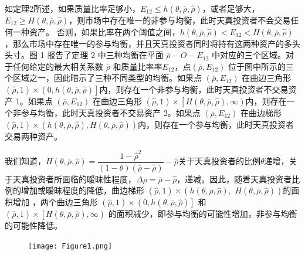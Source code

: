 \documentclass[10.0pt]{article}
\begin{document}
\quad \ 


如定理2所述，如果质量比率足够小，$ E_{1 2} \leqslant h (\theta, \overline{\rho}, {\hat \rho}) $，或者足够大，$ E_{ 1 2} \geqslant H (\theta, \overline{\rho}, {\hat \rho}) $，则市场中存在唯一的非参与均衡，此时天真投资者不会交易任何一种资产。 否则，如果比率在两个阈值之间，$ h (\theta, \overline{\rho}, {\hat \rho}) < E_{1 2} < H (\theta, \overline{\rho} , {\hat \rho}) $，那么市场中存在唯一的参与均衡，并且天真投资者同时将持有这两种资产的多头头寸。图 1 报告了定理 2 中三种均衡在平面 $ \overline{\rho} - O - E_{1 2} $ 中对应的三个区域。对于任何给定的最大相关系数 $ \overline{\rho} $ 和质量比率率$ E_{1 2} $，点$ \left( \overline{\rho}, E_{1 2} \right) $ 位于图中所示的三个区域之一，因此暗示了三种不同类型的均衡。如果点 $ \left( \overline{\rho}, E_{1 2} \right) $ 在曲边三角形 $ (\hat{\rho}, 1) \times \left( 0, h (\theta , \overline{\rho}, {\hat \rho}) \right] $内，则存在一个非参与均衡，此时天真投资者不交易资产 1。如果点 $ \left( \overline {\rho}, E_{1 2} \right) $ 在曲边三角形 $ (\hat{\rho}, 1) \times \left[ H (\theta, \overline{\rho}, {\hat \rho}), \infty \right) $内，则存在一个非参与均衡，此时天真投资者不交易资产 2。如果点 $ \left( \overline{\rho}, E_{1 2} \right) $ 在曲边梯形 $ (\hat{\rho}, 1) \times \left( h (\theta, \overline{\rho}, {\hat \rho}), H (\theta, \overline{\rho}, {\hat \rho}) \right) $内，则存在一个参与均衡，此时天真投资者交易两种资产。



我们知道，$H (\theta, \overline{\rho}, {\hat \rho}) = \dfrac{1 - {\hat \rho}^2}{(1 - \theta) (\overline{ \rho} - {\hat \rho})} - {\hat \rho} $关于天真投资者的比例$ \theta $递增，关于天真投资者所面临的暧昧性程度，$ \Delta \rho = \overline{\rho} - \hat{\rho} $，递减。因此，随着天真投资者比例的增加或暧昧程度的降低，曲边梯形 $ (\hat{\rho}, 1) \times \left( h (\theta, \overline{\rho}, {\hat \rho}), \right. $ $ \left. H (\theta, \overline{\rho}, {\hat \rho}) \right) $的面积增加 ，两个曲边三角形 $ (\hat{\rho}, 1) \times \left( 0, h (\theta, \overline{\rho}, {\hat \rho}) \right] $ 和 $ (\hat{\rho}, 1) \times \left[ H (\theta, \overline{\rho}, {\hat \rho}), \infty \right) $ 的面积减少，即参与均衡的可能性增加，非参与均衡的可能性降低。

\newpage



\begin{figure}
	\centering
	\texttt{[image: Figure1.png]}
\end{figure}

\end{document}
